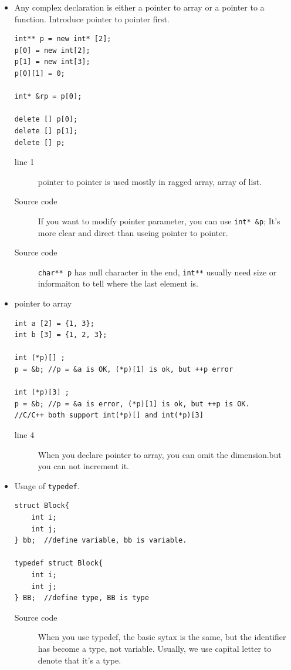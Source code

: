 \documentclass[a4paper,11pt,twoside]{book}
\begin{document}
\begin{itemize}	
	\item Any complex declaration is either a pointer to array or a pointer to a function. Introduce pointer to pointer first.
\begin{lstlisting}
int** p = new int* [2];
p[0] = new int[2];
p[1] = new int[3];
p[0][1] = 0;

int* &rp = p[0];

delete [] p[0];
delete [] p[1];
delete [] p;		
\end{lstlisting}
	\begin{description}
		\item[line 1] pointer to pointer is used mostly in ragged array, array of list. 
		\item[Source code] If you want to modify pointer parameter, you can use \texttt{int* \&p}; It's more clear and direct than useing pointer to pointer. 
		\item[Source code] \texttt{char** p} has null character in the end, \texttt{int**} usually need size or informaiton to tell where the last element is.
	\end{description}	
	
	\item pointer to array
\begin{lstlisting}
int a [2] = {1, 3};
int b [3] = {1, 2, 3};

int (*p)[] ;
p = &b; //p = &a is OK, (*p)[1] is ok, but ++p error

int (*p)[3] ;
p = &b; //p = &a is error, (*p)[1] is ok, but ++p is OK.
//C/C++ both support int(*p)[] and int(*p)[3]
\end{lstlisting}
	\begin{description}
		\item[line 4] When you declare pointer to array, you can omit the dimension.but you can not increment it.
	\end{description}
	
	\item Usage of \texttt{typedef}.
\begin{lstlisting}[]
struct Block{
	int i;
	int j;
} bb;  //define variable, bb is variable.

typedef struct Block{
	int i;
	int j;
} BB;  //define type, BB is type 
\end{lstlisting}
	\begin{description}
		\item[Source code] When you use typedef, the basic sytax is the same, but the identifier has become a type, not variable. Usually, we use capital letter to denote that it's a type.
	\end{description}
	

\end{itemize}
\end{document}

